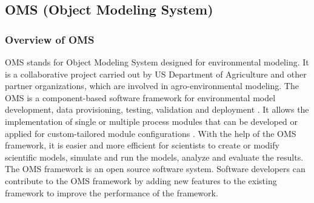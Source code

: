 \subsection{OMS (Object Modeling System)}
\par
\subsubsection{Overview of OMS}
\par
OMS stands for Object Modeling System designed for environmental modeling. It is a collaborative project carried out by US Department of Agriculture and other partner organizations, which are involved in agro-environmental modeling. The OMS is a component-based software framework for environmental model development, data provisioning, testing, validation and deployment \autocite{dsl:oms-david}. It allows the implementation of single or multiple process modules that can be developed or applied for custom-tailored module configurations \autocite{dsl:oms-ascough}. With the help of the OMS framework, it is easier and more efficient for scientists to create or modify scientific models, simulate and run the models, analyze and evaluate the results. The OMS framework is an open source software system. Software developers can contribute to the OMS framework by adding new features to the existing framework to improve the performance of the framework.
\par
